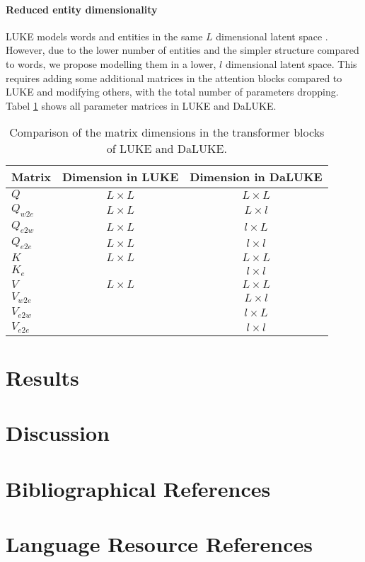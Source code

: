 \documentclass[10pt, a4paper]{article}
\begin{document}
\paragraph{Reduced entity dimensionality}
LUKE models words and entities in the same $ L $ dimensional latent space \cite{yamada2020luke}.
However, due to the lower number of entities and the simpler structure compared to words, we propose modelling them in a lower, $ l $ dimensional latent space.
This requires adding some additional matrices in the attention blocks compared to LUKE and modifying others, with the total number of parameters dropping.
Tabel \ref{tab:mats} shows all parameter matrices in LUKE and DaLUKE.
\begin{table}[H]
    \centering
    \footnotesize
    \begin{tabular}{l|c|c}
        Matrix&Dimension in LUKE&Dimension in DaLUKE\\\hline
        $ Q $&$ L\times L $&$ L\times L $\\
        $ Q_{w2e} $&$ L\times L $&$ L\times l $\\
        $ Q_{e2w} $&$ L\times L $&$ l\times L $\\
        $ Q_{e2e} $&$ L\times L $&$ l\times l $\\
        $ K $&$ L\times L $&$ L\times L $\\
        $ K_e $&&$ l\times l $\\
        $ V $&$ L\times L $&$ L\times L $\\
        $ V_{w2e} $&&$ L\times l $\\
        $ V_{e2w} $&&$ l\times L $\\
        $ V_{e2e} $&&$ l\times l $\\
    \end{tabular}
    \caption{Comparison of the matrix dimensions in the transformer blocks of LUKE and DaLUKE.}
    \label{tab:mats}
\end{table}\noindent

\section{Results}

\section{Discussion}

\section{Bibliographical References}\label{reference}




\section{Language Resource References}
\label{lr:ref}
\end{document}
